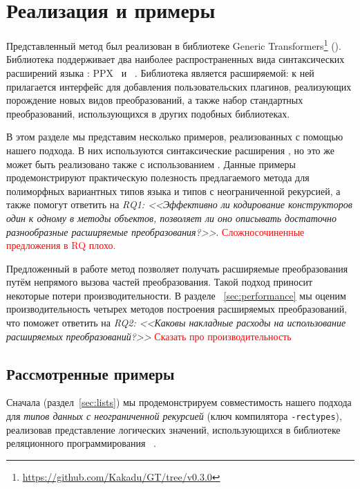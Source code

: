 \section{Реализация и примеры}
\label{sec:Evaluation}

Представленный метод был реализован в библиотеке Generic Transformers\footnote{\url{https://github.com/Kakadu/GT/tree/v0.3.0}} (\GT). Библиотека  поддерживает два наиболее распространенных вида синтаксических расширений языка \ocaml{}: \textsc{PPX}~\cite{PPXLib} и \camlpfive~\cite{camlp5}. Библиотека \GT{} является расширяемой: к ней прилагается интерфейс для добавления пользовательских плагинов, реализующих порождение новых видов преобразований, а также набор стандартных преобразований, использующихся в других подобных библиотеках.


В этом разделе мы представим несколько примеров, реализованных с помощью нашего подхода. В них используются синтаксические расширения \camlpfive{}, но это же может быть реализовано также с использованием \PPX{}. Данные примеры продемонстрируют практическую полезность предлагаемого метода для полиморфных вариантных типов языка \OCaml{} и типов с неограниченной рекурсией, а также  помогут ответить на \emph{RQ1: <<Эффективно ли  кодирование конструкторов один к одному в методы объектов, позволяет ли оно описывать достаточно разнообразные расширяемые преобразования?>>}.
\textcolor{red}{Сложносочиненные предложения в RQ плохо.}

Предложенный в работе метод позволяет получать расширяемые преобразования путём непрямого вызова частей преобразования. Такой подход приносит некоторые потери производительности. В разделе ~\ref{sec:performance} мы оценим производительность четырех методов построения расширяемых преобразований, что поможет ответить на 
\emph{RQ2: <<Каковы накладные расходы на использование расширяемых преобразований?>>}
\textcolor{red}{Сказать про производительность}

\subsection{Рассмотренные примеры}

Сначала (раздел~\ref{sec:lists}) мы продемонстрируем совместимость 
нашего подхода для \emph{типов данных с неограниченной рекурсией}
(ключ компилятора \texttt{-rectypes}), 
реализовав
представление логических значений, использующихся в  библиотеке реляционного программирования \OCanren{}~\cite{OCanren}. %

